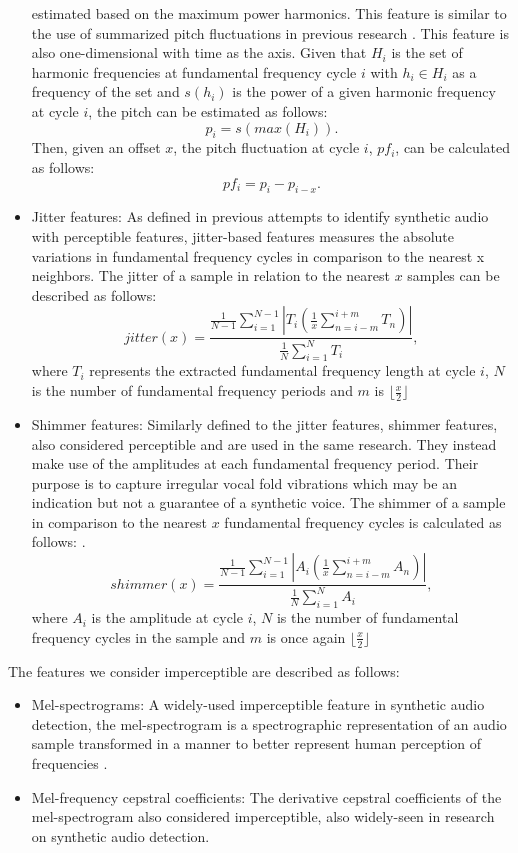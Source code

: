 \documentclass{article}
\begin{document}
\begin{itemize}
					estimated based on the maximum power harmonics. This feature is similar to the
					use of summarized pitch fluctuations in previous research
					\cite{khanjani_learning_2023}. This feature is also one-dimensional with time
					as the axis. Given that \(H_{i}\) is the set of harmonic frequencies at
					fundamental frequency cycle \(i\) with \(h_{i} \in H_{i}\) as a frequency of
					the set and \(s(h_{i})\) is the power of a given harmonic frequency at cycle
					\(i\), the pitch can be estimated as follows:
					\[p_{i} = s(max(H_{i})).\]
					Then, given an offset \(x\), the pitch fluctuation at cycle \(i\), \(pf_{i}\),
					can be calculated as follows:
					\[pf_{i} = p_{i}-p_{i-x}.\]
				\item
					Jitter features: As defined in previous attempts to identify synthetic audio
					\cite{chaiwongyen_deepfake-speech_2023} with perceptible features,
					jitter-based features measures the absolute variations in fundamental
					frequency cycles in comparison to the nearest x neighbors. The jitter of a
					sample in relation to the nearest \(x\) samples can be described as follows:
					\[ jitter(x) = \frac{ \frac{1}{N-1}\sum_{i=1}^{N-1}|T_{i}
						(\frac{1}{x}\sum_{n=i-m}^{i+m}T_{n})|}
					{\frac{1}{N}\sum_{i=1}^{N}T_{i}}, \]
					where \(T_{i}\) represents the extracted fundamental frequency length at cycle
					\(i\), \(N\) is the number of fundamental frequency periods and \(m\) is
					\(\lfloor \frac{x}{2} \rfloor\)
				\item
					Shimmer features: Similarly defined to the jitter features, shimmer features,
					also considered perceptible and are used in the same research. They instead
					make use of the amplitudes at each fundamental frequency period. Their purpose
					is to capture irregular vocal fold vibrations which may be an indication but
					not a guarantee of a synthetic voice. The shimmer of a sample in comparison to
					the nearest \(x\) fundamental frequency cycles is calculated as follows:
					\cite{chaiwongyen_deepfake-speech_2023}.
					\[ shimmer(x) = \frac{ \frac{1}{N-1}\sum_{i=1}^{N-1}|A_{i}
						(\frac{1}{x}\sum_{n=i-m}^{i+m}A_{n})|}
					{\frac{1}{N}\sum_{i=1}^{N}A_{i}}, \]
					where \(A_{i}\) is the amplitude at cycle \(i\), \(N\) is the number of
					fundamental frequency cycles in the sample and \(m\) is once again 
					\(\lfloor \frac{x}{2} \rfloor\)
			\end{itemize}
			The features we consider imperceptible are described as follows:
			\begin{itemize}
				\item
					Mel-spectrograms: A widely-used imperceptible feature in synthetic audio
					detection, the mel-spectrogram is a spectrographic representation of an audio
					sample transformed in a manner to better represent human perception of
					frequencies \cite{qais_deepfake_2022}.
				\item
					Mel-frequency cepstral coefficients: The derivative cepstral coefficients of
					the mel-spectrogram also considered imperceptible, also widely-seen in
					research on synthetic audio detection.
			\end{itemize}
\end{document}
